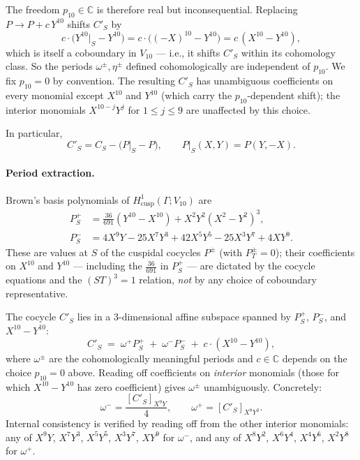 \documentclass[11pt,letterpaper]{article}
\newcommand{\CC}{\mathbb{C}}
\begin{document}
The freedom $p_{10} \in \CC$ is therefore real but inconsequential. Replacing $P \to P + c\, Y^{10}$ shifts $C'_S$ by
\[
  c \cdot \bigl(Y^{10}\big|_S - Y^{10}\bigr) = c \cdot \bigl((-X)^{10} - Y^{10}\bigr) = c\,(X^{10} - Y^{10}),
\]
which is itself a coboundary in $V_{10}$ — i.e., it shifts $C'_S$ within its cohomology class. So the periods $\omega^\pm, \eta^\pm$ defined cohomologically are independent of $p_{10}$. We fix $p_{10} = 0$ by convention. The resulting $C'_S$ has unambiguous coefficients on every monomial except $X^{10}$ and $Y^{10}$ (which carry the $p_{10}$-dependent shift); the interior monomials $X^{10-j}Y^j$ for $1 \le j \le 9$ are unaffected by this choice.

In particular,
\[
  C'_S = C_S - \bigl(P\big|_S - P\bigr), \qquad P\big|_S(X,Y) = P(Y, -X).
\]

\paragraph{Period extraction.} Brown's basis polynomials of $H^1_{\mathrm{cusp}}(\Gamma; V_{10})$ \cite[\S 8.2]{Brown2017} are
\begin{align*}
  P^+_S &= \tfrac{36}{691}(Y^{10} - X^{10}) + X^2 Y^2 (X^2 - Y^2)^3, \\
  P^-_S &= 4 X^9 Y - 25 X^7 Y^3 + 42 X^5 Y^5 - 25 X^3 Y^7 + 4 X Y^9.
\end{align*}
These are values at $S$ of the cuspidal cocycles $P^\pm$ (with $P^\pm_T = 0$); their coefficients on $X^{10}$ and $Y^{10}$ — including the $\tfrac{36}{691}$ in $P^+_S$ — are dictated by the cocycle equations and the $(ST)^3 = 1$ relation, \emph{not} by any choice of coboundary representative.

The cocycle $C'_S$ lies in a $3$-dimensional affine subspace spanned by $P^+_S$, $P^-_S$, and $X^{10} - Y^{10}$:
\begin{equation}\label{eq:decomp}
  C'_S \;=\; \omega^+ P^+_S \;+\; \omega^- P^-_S \;+\; c \cdot (X^{10} - Y^{10}),
\end{equation}
where $\omega^\pm$ are the cohomologically meaningful periods and $c \in \CC$ depends on the choice $p_{10} = 0$ above. Reading off coefficients on \emph{interior} monomials (those for which $X^{10}-Y^{10}$ has zero coefficient) gives $\omega^\pm$ unambiguously. Concretely:
\[
  \omega^- = \frac{[C'_S]_{X^9 Y}}{4}, \qquad
  \omega^+ = [C'_S]_{X^8 Y^2}.
\]
Internal consistency is verified by reading off from the other interior monomials: any of $X^9Y$, $X^7 Y^3$, $X^5 Y^5$, $X^3 Y^7$, $X Y^9$ for $\omega^-$, and any of $X^8 Y^2$, $X^6 Y^4$, $X^4 Y^6$, $X^2 Y^8$ for $\omega^+$.
\end{document}
